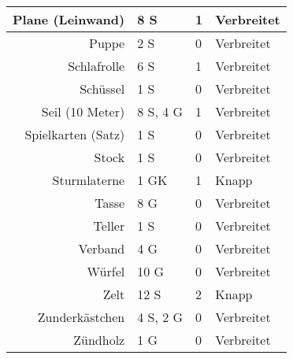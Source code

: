 \documentclass[a4paper, 9pt]{scrartcl}
\begin{document}
\begin{table}[]
\begin{minipage}{.5\linewidth}
\begin{tabularx}{0.95\linewidth}{Rlll}
            Plane (Leinwand)    & 8 S            & 1           & Verbreitet     \\ \hline
            Puppe               & 2 S            & 0           & Verbreitet     \\ \hline
            Schlafrolle         & 6 S            & 1           & Verbreitet     \\ \hline
            Schüssel            & 1 S            & 0           & Verbreitet     \\ \hline
            Seil (10 Meter)     & 8 S, 4 G       & 1           & Verbreitet     \\ \hline
            Spielkarten (Satz)  & 1 S            & 0           & Verbreitet     \\ \hline
            Stock               & 1 S            & 0           & Verbreitet     \\ \hline
            Sturmlaterne        & 1 GK           & 1           & Knapp          \\ \hline
            Tasse               & 8 G            & 0           & Verbreitet     \\ \hline
            Teller              & 1 S            & 0           & Verbreitet     \\ \hline
            Verband             & 4 G            & 0           & Verbreitet     \\ \hline
            Würfel              & 10 G           & 0           & Verbreitet     \\ \hline
            Zelt                & 12 S           & 2           & Knapp          \\ \hline
            Zunderkästchen      & 4 S, 2 G       & 0           & Verbreitet     \\ \hline
            Zündholz            & 1 G            & 0           & Verbreitet
        \end{tabularx}

        \vspace{2em}


\end{minipage}
\end{table}
\end{document}
